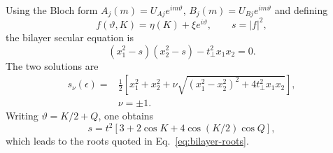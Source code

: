 Using the Bloch form $A_j(m)=U_{Aj}e^{im\vartheta}$, $B_j(m)=U_{Bj}e^{im\vartheta}$ and defining
\begin{equation}
    f(\vartheta,K)=\eta(K)+\xi e^{i\vartheta},
    \qquad
    s=|f|^2,
\end{equation}
the bilayer secular equation is
\begin{equation}
    (x_1^2-s)(x_2^2-s)-t_\perp^2x_1x_2=0.
\end{equation}
The two solutions are
\begin{equation}
\begin{split}
    s_\nu(\epsilon)
    ={}&
    \frac{1}{2}
    \left[
        x_1^2+x_2^2
        +\nu\sqrt{(x_1^2-x_2^2)^2+4t_\perp^2x_1x_2}
    \right],
    \\
    &\nu=\pm1.
\end{split}
\end{equation}
Writing $\vartheta=K/2+Q$, one obtains
\begin{equation}
    s=t^2\left[3+2\cos K+4\cos(K/2)\cos Q\right],
\end{equation}
which leads to the roots quoted in Eq.~\eqref{eq:bilayer-roots}.
